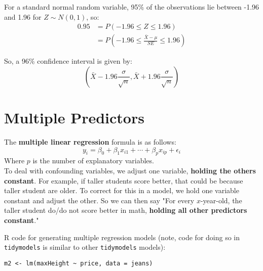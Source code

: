 \documentclass[titlepage, 12pt, leqno]{article}
\begin{document}
\begin{ex}
    For a standard normal random variable, 95\% of the observations lie between -1.96 and 1.96 for $Z \sim N(0,1)$, so:
   \begin{align*}
       0.95 &= P(-1.96 \le Z \le 1.96) \\
            &= P(-1.96 \le \frac{\bar X - \mu}{SE} \le 1.96)
   \end{align*}
   
   So, a 96\% confidence interval is given by:
   \[
   \boxed{\left(\bar X - 1.96\frac{\sigma}{\sqrt n}, \bar X + 1.96\frac{\sigma}{\sqrt n}\right)}
   \]
\end{ex}

\pagebreak
\section{Multiple Predictors}
The \textbf{multiple linear regression} formula is as follows:
\[
    y_i =\beta_0 +\beta_1x_{i1} + \cdots +\beta_px_{ip} +\epsilon_i
\]
Where $p$ is the number of explanatory variables.\\[.1in]
To deal with confounding variables, we adjust one variable, \textbf{holding the others constant}. For example, if taller students score better, that could be because taller student are older. To correct for this in a model, we hold one variable constant and adjust the other. So we can then say "For every $x$-year-old, the taller student do/do not score better in math, \textbf{holding all other predictors constant}."

R code for generating multiple regression models (note, code for doing so in \texttt{tidymodels} is similar to other \texttt{tidymodels} models):
\begin{verbatim}
m2 <- lm(maxHeight ~ price, data = jeans)
\end{verbatim}
\end{document}
